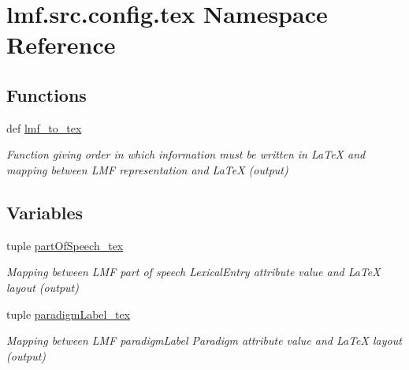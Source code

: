 \hypertarget{namespacelmf_1_1src_1_1config_1_1tex}{\section{lmf.\+src.\+config.\+tex Namespace Reference}
\label{namespacelmf_1_1src_1_1config_1_1tex}
}
\subsection*{Functions}
\begin{DoxyCompactItemize}
\item 
def \hyperlink{namespacelmf_1_1src_1_1config_1_1tex_ac85ca206e865c9cc1d77b77c72a429d2}{lmf\+\_\+to\+\_\+tex}
\begin{DoxyCompactList}\small\item\em Function giving order in which information must be written in La\+Te\+X and mapping between L\+M\+F representation and La\+Te\+X (output) \end{DoxyCompactList}\end{DoxyCompactItemize}
\subsection*{Variables}
\begin{DoxyCompactItemize}
\item 
tuple \hyperlink{namespacelmf_1_1src_1_1config_1_1tex_a94016d28cbde962dd9dee1465bf19548}{part\+Of\+Speech\+\_\+tex}
\begin{DoxyCompactList}\small\item\em Mapping between L\+M\+F part of speech Lexical\+Entry attribute value and La\+Te\+X layout (output) \end{DoxyCompactList}\item 
tuple \hyperlink{namespacelmf_1_1src_1_1config_1_1tex_a2a4c92ffc93b18380a5eb8971c518776}{paradigm\+Label\+\_\+tex}
\begin{DoxyCompactList}\small\item\em Mapping between L\+M\+F paradigm\+Label Paradigm attribute value and La\+Te\+X layout (output) \end{DoxyCompactList}\end{DoxyCompactItemize}


